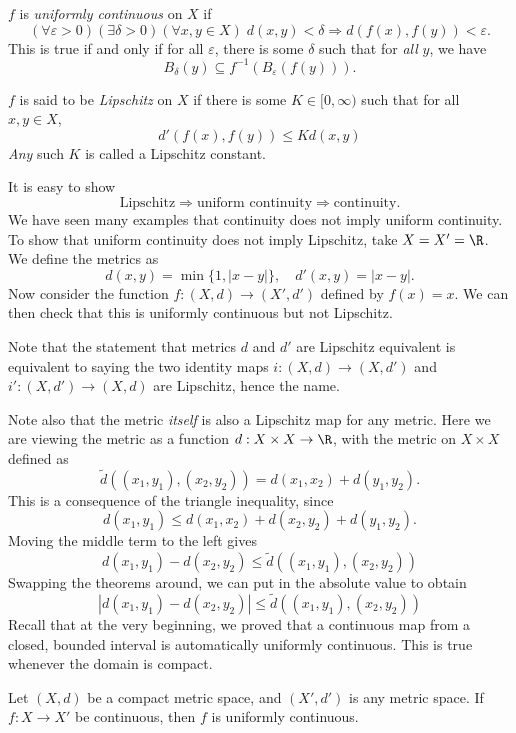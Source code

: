 \documentclass[a4paper]{article}
\begin{document}
\begin{defi}
  $f$ is \emph{uniformly continuous} on $X$ if
  \[
    (\forall \varepsilon > 0)(\exists \delta > 0)(\forall x, y \in X)\; d(x, y) < \delta \Rightarrow d(f(x), f(y)) < \varepsilon.
  \]
  This is true if and only if for all $\varepsilon$, there is some $\delta$ such that for \emph{all} $y$, we have
  \[
    B_\delta(y) \subseteq f^{-1} (B_\varepsilon(f(y))).
  \]
\end{defi}

\begin{defi}
  $f$ is said to be \emph{Lipschitz} on $X$ if there is some $K \in [0, \infty)$ such that for all $x, y \in X$,
  \[
    d'(f(x), f(y)) \leq K d(x, y)
  \]
  \emph{Any} such $K$ is called a Lipschitz constant.
\end{defi}
It is easy to show
\[
  \text{Lipschitz} \Rightarrow \text{uniform continuity} \Rightarrow \text{continuity}.
\]
We have seen many examples that continuity does not imply uniform continuity. To show that uniform continuity does not imply Lipschitz, take $X = X' = \R$. We define the metrics as
\[
  d(x, y) = \min\{1, |x - y|\}, \quad d'(x, y) = |x - y|.
\]
Now consider the function $f: (X, d) \to (X', d')$ defined by $f(x) = x$. We can then check that this is uniformly continuous but not Lipschitz.

Note that the statement that metrics $d$ and $d'$ are Lipschitz equivalent is equivalent to saying the two identity maps $i: (X, d) \to (X, d')$ and $i': (X, d') \to (X, d)$ are Lipschitz, hence the name.

Note also that the metric \emph{itself} is also a Lipschitz map for any metric. Here we are viewing the metric as a function $d: X\times X \to \R$, with the metric on $X\times X$ defined as
\[
  \tilde{d}((x_1, y_1), (x_2, y_2)) = d(x_1, x_2) + d(y_1, y_2).
\]
This is a consequence of the triangle inequality, since
\[
  d(x_1, y_1) \leq d(x_1, x_2) + d(x_2, y_2) + d(y_1, y_2).
\]
Moving the middle term to the left gives
\[
  d(x_1, y_1) - d(x_2, y_2) \leq \tilde{d}((x_1, y_1), (x_2, y_2))
\]
Swapping the theorems around, we can put in the absolute value to obtain
\[
  |d(x_1, y_1) - d(x_2, y_2)| \leq \tilde{d}((x_1, y_1), (x_2, y_2))
\]
Recall that at the very beginning, we proved that a continuous map from a closed, bounded interval is automatically uniformly continuous. This is true whenever the domain is compact.
\begin{thm}
  Let $(X, d)$ be a compact metric space, and $(X', d')$ is any metric space. If $f: X\to X'$ be continuous, then $f$ is uniformly continuous.
\end{thm}
\end{document}
